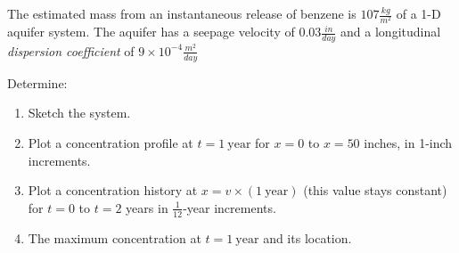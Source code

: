 \documentclass[12pt]{article}
\begin{document}
\begin{enumerate}
The estimated mass from an instantaneous release of benzene is $107 \frac{kg}{m^2}$ of a 1-D aquifer system. The aquifer has a seepage velocity of $0.03 \frac{in}{day}$ and a longitudinal \textsl{dispersion coefficient} of $9 \times 10^{-4}\frac{m^2}{day}$

Determine:
\begin{enumerate}
\item Sketch the system.
\item Plot a concentration profile at $t = 1~\text{year}$ for $x = 0$ to $x = 50$ inches, in 1-inch increments.
\item Plot a concentration history at $x=v\times (1~\text{year})$ (this value stays constant) for $t = 0$ to $t = 2 $ years in $\frac{1}{12}$-year increments.
\item The maximum concentration at $t = 1~\text{year}$ and its location.
\end{enumerate}


\end{enumerate}
\end{document}
